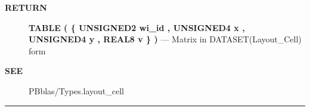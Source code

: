 \par
\begin{description}
\item [\colorbox{tagtype}{\color{white} \textbf{\textsf{RETURN}}}] \textbf{TABLE ( \{ UNSIGNED2 wi\_id , UNSIGNED4 x , UNSIGNED4 y , REAL8 v \} )} --- Matrix in DATASET(Layout\_Cell) form
\end{description}






\par
\begin{description}
\item [\colorbox{tagtype}{\color{white} \textbf{\textsf{SEE}}}] PBblas/Types.layout\_cell
\end{description}




\rule{\linewidth}{0.5pt}
